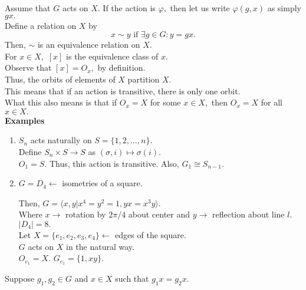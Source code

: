 \documentclass[12 pt, a4paper, toc=graduated, oneside]{article}
\theoremstyle{definition}
\begin{document}
Assume that $G$ acts on $X.$ If the action is $\varphi,$ then let us write $\varphi(g, x)$ as simply $gx.$ \\
Define a relation on $X$ by
\[x \sim y \text{ if } \exists g \in G: y = gx.\]
Then, $\sim$ is an equivalence relation on $X.$\\
For $x \in X,$ $[x]$ is the equivalence class of $x.$\\
Observe that $[x] = O_x,$ by definition.\\
Thus, the orbits of elements of $X$ partition $X.$\\
This means that if an action is transitive, there is only one orbit.\\
What this also means is that if $O_x = X$ for some $x \in X,$ then $O_x = X$ for all $x \in X.$\\
\textbf{Examples}
\begin{enumerate}[nosep] 
	\item $S_n$ acts naturally on $S = \{1, 2, \ldots, n\}.$\\
	Define $S_n \times S \to S$ as $(\sigma, i) \mapsto \sigma(i).$\\
	$O_1 = S.$ Thus, this action is transitive. Also, $G_1 \cong S_{n-1}.$
	\item $G = D_4 \longleftarrow$ isometries of a square.\\
	\begin{center}
	\end{center}
Then, $G = \langle x, y | x^4 = y^2 = 1, yx = x^3y\rangle.$\\
Where $x \longrightarrow$ rotation by $2\pi/4$ about center and $y \longrightarrow$ reflection about line $l.$\\
$|D_4| = 8.$\\
Let $X = \{e_1, e_2, e_3, e_4\} \longleftarrow$ edges of the square.\\
$G$ acts on $X$ in the natural way.\\
$O_{e_1} = X.$ $G_{e_1} = \{1, xy\}.$
\end{enumerate}
Suppose $g_1, g_2 \in G$ and $x \in X$ such that $g_1x = g_2x.$\\
\end{document}
